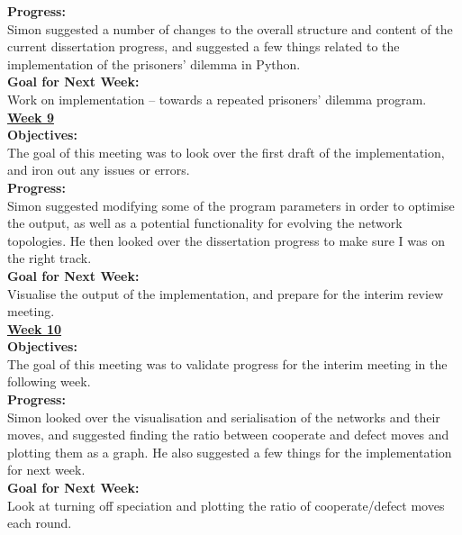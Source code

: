 \documentclass[12pt,a4paper]{article}
\begin{document}
\begin{appendices}
\textbf{Progress:} \\
Simon suggested a number of changes to the overall structure and content of the current dissertation progress, and suggested a few things related to the implementation of the prisoners’ dilemma in Python. \\

\textbf{Goal for Next Week:} \\
Work on implementation – towards a repeated prisoners’ dilemma program. \\

\textbf{\underline{Week 9}} \\
\newline
\textbf{Objectives:} \\
The goal of this meeting was to look over the first draft of the implementation, and iron out any issues or errors. \\

\textbf{Progress:} \\
Simon suggested modifying some of the program parameters in order to optimise the output, as well as a potential functionality for evolving the network topologies. He then looked over the dissertation progress to make sure I was on the right track. \\

\textbf{Goal for Next Week:} \\
Visualise the output of the implementation, and prepare for the interim review meeting. \\

\textbf{\underline{Week 10}} \\
\newline
\textbf{Objectives:} \\
The goal of this meeting was to validate progress for the interim meeting in the following week. \\

\textbf{Progress:} \\
Simon looked over the visualisation and serialisation of the networks and their moves, and suggested finding the ratio between cooperate and defect moves and plotting them as a graph. He also suggested a few things for the implementation for next week. \\

\textbf{Goal for Next Week:} \\
Look at turning off speciation and plotting the ratio of cooperate/defect moves each round. \\


\end{appendices}
\end{document}
